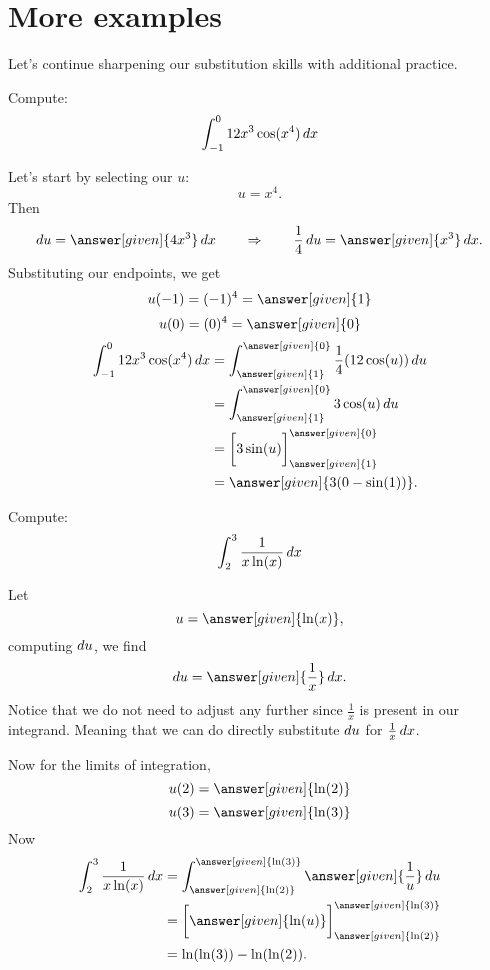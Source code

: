 \documentclass{ximera}
\begin{document}
\section{More examples}

Let's continue sharpening our substitution skills with additional practice.


\begin{example}
Compute:
\[
\int_{-1}^0 12x^3 \cos({x^4}) \mathop{}\!d x
\]
\begin{explanation}
Let's start by selecting our $u$:
\[
u = x^4.
\]
Then
\[
\d u = \answer[given]{4x^3} \d x 	\qquad	\Rightarrow	\qquad	\frac{1}{4}\d u = \answer[given]{x^3} \d x.
\]
Substituting our endpoints, we get
\[u(-1)=(-1)^4=\answer[given]{1}\]
\[u(0)=(0)^4=\answer[given]{0}\]
\begin{align*}
\int_{-1}^0 12x^3 \cos({x^4}) \d x &= \int_{\answer[given]{1}}^{\answer[given]{0}} \frac{1}{4}(12\cos({u})) \d u  \\
&= \int_{\answer[given]{1}}^{\answer[given]{0}} 3 \cos({u}) \d u  \\
&= \eval{3\sin({u})}_{\answer[given]{1}}^{\answer[given]{0}}  \\
&= \answer[given]{3(0-\sin({1}))}.
\end{align*}
\end{explanation}
\end{example}




\begin{example}
Compute:
\[
\int_{2}^{3} \frac{1}{x\ln(x)} \mathop{}\!d x
\]
\begin{explanation}
  Let
  \[
  u =\answer[given]{\ln(x)},
  \]
  computing $\mathop{}\!d u$, we find
  \[
  \d u =\answer[given]{\frac{1}{x}}\d x.
  \]
Notice that we do not need to adjust any further since $\frac{1}{x}$ is present in our integrand. Meaning that we can do directly substitute $\mathop{}\!d u$ for $\frac{1}{x} \mathop{}\!d x$.

Now for the limits of integration,
\[u(2)=\answer[given]{\ln(2)}\]
\[u(3)=\answer[given]{\ln(3)}\]
  Now
\begin{align*}
\int_{2}^{3} \frac{1}{x\ln(x)} \d x &=  \int_{\answer[given]{\ln(2)}}^{\answer[given]{\ln(3)}} \answer[given]{\frac{1}{u}} \d u\\
&= \eval{\answer[given]{\ln(u)}}_{\answer[given]{\ln(2)}}^{\answer[given]{\ln(3)}}\\
& = \ln(\ln(3)) - \ln(\ln(2)).
\end{align*}
\end{explanation}
\end{example}
\end{document}
